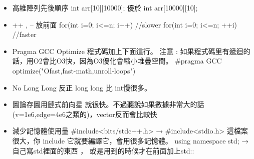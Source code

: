 \begin{itemize}
\item 高維陣列先後順序
int arr[10][10000]; 優於 int arr[10000][10];

\item ++ , -- 放前面
for(int i=0; i<=n; i++)   //slower
for(int i=0; i<=n; ++i)   //faster

\item Pragma GCC Optimize
程式碼加上下面這行。
注意 : 如果程式碼里有遞迴的話，用O2會比O3快，因為O3優化會縮小堆疊空間。
#pragma GCC optimize("Ofast,fast-math,unroll-loops")

\item No Long Long
反正 long long 比 int慢很多。

\item 圖論存圖用鏈式前向星
就很快。不過聽說如果數據非常大的話(v=1e6,edge=4e6之類的)，vector反而會比較快

\item 減少記憶體使用量
#include<bits/stdc++.h> → #include<stdio.h>
這檔案很大，你 include 它就要編譯它，會用很多記憶體。
using namespace std; → 自己寫std裡面的東西 ， 或是用到的時候才在前面加上std::
\end{itemize}
